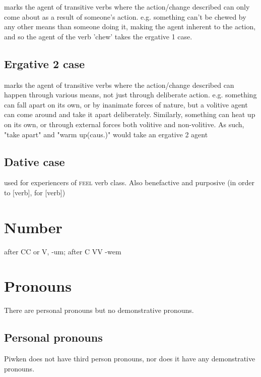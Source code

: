 \documentclass[smallroyalvopaper,9pt]{memoir}
\newcommand{\langeng}{Piwken}
\begin{document}
marks the agent of transitive verbs where the action/change described can only come about as a result of someone's action. e.g. something can't be chewed by any other means than someone doing it, making the agent inherent to the action, and so the agent of the verb 'chew' takes the ergative 1 case. 

\subsection{Ergative 2 case}


marks the agent of transitive verbs where the action/change described can happen through various means, not just through deliberate action. e.g. something can fall apart on its own, or by inanimate forces of nature, but a volitive agent can come around and take it apart deliberately. Similarly, something can heat up on its own, or through external forces both volitive and non-volitive. As such, "take apart" and "warm up(caus.)" would take an ergative 2 agent

\subsection{Dative case}

used for experiencers of \textsc{feel} verb class. Also benefactive and purposive (in order to [verb], for [verb])

\section{Number}

after CC or V, -um; after C VV -wem

\section{Pronouns}

There are personal pronouns but no demonstrative pronouns.

\subsection{Personal pronouns}

\langeng{} does not have third person pronouns, nor does it have any demonstrative pronouns. 
\end{document}
